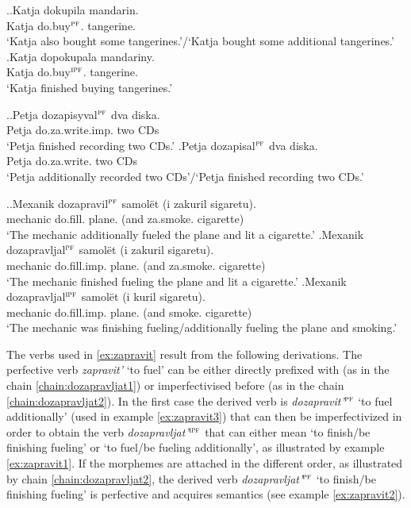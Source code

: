 \ex.\ag.\label{ex:do:kupit}Katja dokupila mandarin.\\
Katja do.buy$^{\textsc{pf}}$. tangerine.\\
\trans `Katja also bought some tangerines.'/`Katja bought some additional tangerines.'
\bg.\label{ex:do:pokupat}Katja dopokupala mandariny.\\
Katja do.buy$^{\textsc{ipf}}$. tangerine.\\
\trans `Katja finished buying tangerines.'

\ex.\ag.\label{ex:do:zapisyvat}Petja dozapisyval$^{\textsc{pf}}$ dva diska.\\
Petja do.za.write.imp. two CDs\\
\trans `Petja finished recording two CDs.'
\bg.\label{ex:do:zapisat}Petja dozapisal$^{\textsc{pf}}$ dva diska.\\
Petja do.za.write. two CDs\\
\trans `Petja additionally recorded two CDs'/`Petja finished recording two CDs.'

\ex.\label{ex:zapravit}\ag.\label{ex:zapravit3}Mexanik dozapravil$^{\textsc{pf}}$ samol\"et (i zakuril sigaretu).\\
mechanic do.fill. plane. (and za.smoke. cigarette)\\
\trans `The mechanic additionally fueled the plane and lit a cigarette.'
\bg.\label{ex:zapravit2}Mexanik dozapravljal$^{\textsc{pf}}$ samol\"et (i zakuril sigaretu).\\
mechanic do.fill.imp. plane. (and za.smoke. cigarette)\\
\trans `The mechanic finished fueling the plane and lit a cigarette.'
\bg.\label{ex:zapravit1}Mexanik dozapravljal$^{\textsc{ipf}}$ samol\"et (i kuril sigaretu).\\
mechanic do.fill.imp. plane. (and smoke. cigarette)\\
\trans `The mechanic was finishing fueling/additionally fueling the plane and smoking.'

The verbs used in \ref{ex:zapravit} result from the following derivations. The perfective verb \textit{zapravit'} `to fuel' can be either directly prefixed with  (as in the chain \ref{chain:dozapravljat1}) or imperfectivised before (as in the chain \ref{chain:dozapravljat2}). In the first case the derived verb is \textit{dozapravit'}$^{\textsc{pf}}$ `to fuel additionally' (used in example \ref{ex:zapravit3}) that can then be imperfectivized in order to obtain the verb \textit{dozapravljat'}$^{\textsc{ipf}}$ that can either mean `to finish/be finishing fueling' or `to fuel/be fueling additionally', as illustrated by example \ref{ex:zapravit1}. If the morphemes are attached in the different order, as illustrated by chain \ref{chain:dozapravljat2}, the derived verb \textit{dozapravljat'}$^{\textsc{pf}}$ `to finish/be finishing fueling' is perfective and acquires  semantics (see example \ref{ex:zapravit2}).

